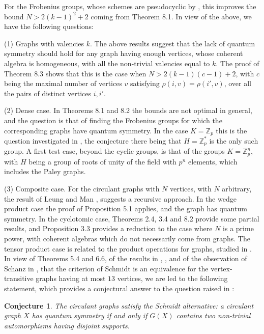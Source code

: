 \documentclass[11pt]{amsart}
\newtheorem{conjecture}[theorem]{Conjecture}
\newcommand{\Z}{\mathbb Z}
\begin{document}
For the Frobenius groups, whose schemes are pseudocyclic by \cite{mp1}, this improves the bound $N>2(k-1)^2+2$ coming from Theorem 8.1. In view of the above, we have the following questions:

\medskip

(1) Graphs with valencies $k$. The above results suggest that the lack of quantum symmetry should hold for any graph having enough vertices, whose coherent algebra is homogeneous, with all the non-trivial valencies equal to $k$. The proof of Theorem 8.3 shows that this is the case when $N>2(k-1)(c-1)+2$, with $c$ being the maximal number of vertices $v$ satisfying $\rho(i,v)=\rho(i',v)$, over all the pairs of distinct vertices $i,i'$.

\medskip

(2) Dense case. In Theorems 8.1 and 8.2 the bounds are not optimal in general, and the question is that of finding the Frobenius groups for which the corresponding graphs have quantum symmetry. In the case $K=\Z_p$ this is the question investigated in \cite{mar}, the conjecture there being that $H=\Z_p^*$ is the only such group. A first test case, beyond the cyclic groups, is that of the groups $K=\Z_p^n$, with $H$ being a group of roots of unity of the field with $p^n$ elements, which includes the Paley graphs.

\medskip

(3) Composite case. For the circulant graphs with $N$ vertices, with $N$ arbitrary, the result of Leung and Man \cite{lm1}, \cite{lm2} suggests a recursive approach. In the wedge product case the proof of Proposition 5.1 applies, and the graph has quantum symmetry. In the cyclotomic case, Theorems 2.4, 3.4 and 8.2 provide some partial results, and Proposition 3.3 provides a reduction to the case where $N$ is a prime power, with coherent algebras which do not necessarily come from graphs. The tensor product case is related to the product operations for graphs, studied in \cite{bb}. In view of Theorems 5.4 and 6.6, of the results in \cite{cha}, \cite{mar}, and of the observation of Schanz in \cite{scz}, that the criterion of Schmidt is an equivalence for the vertex-transitive graphs having at most $13$ vertices, we are led to the following statement, which provides a conjectural answer to the question raised in \cite{scz}:

\begin{conjecture}
The circulant graphs satisfy the Schmidt alternative: a circulant graph $X$ has quantum symmetry if and only if $G(X)$ contains two non-trivial automorphisms having disjoint supports.
\end{conjecture}
\end{document}

